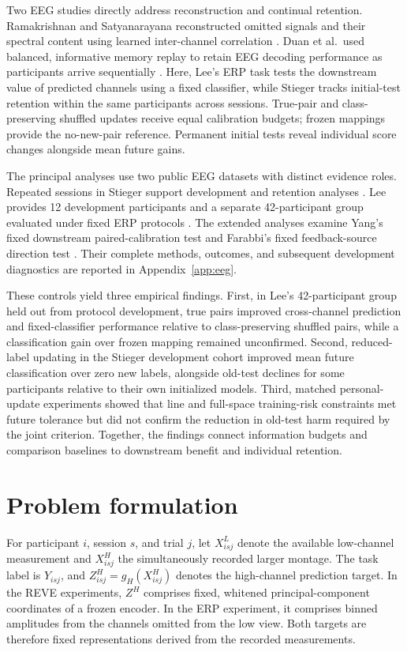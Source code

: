 \documentclass[11pt,a4paper]{article}
\begin{document}
Two EEG studies directly address reconstruction and continual retention. Ramakrishnan and Satyanarayana reconstructed omitted signals and their spectral content using learned inter-channel correlation \cite{ramakrishnan2016}. Duan et al.\ used balanced, informative memory replay to retain EEG decoding performance as participants arrive sequentially \cite{duan2024}. Here, Lee's ERP task tests the downstream value of predicted channels using a fixed classifier, while Stieger tracks initial-test retention within the same participants across sessions. True-pair and class-preserving shuffled updates receive equal calibration budgets; frozen mappings provide the no-new-pair reference. Permanent initial tests reveal individual score changes alongside mean future gains.

The principal analyses use two public EEG datasets with distinct evidence roles. Repeated sessions in Stieger support development and retention analyses \cite{stieger2021}. Lee provides 12 development participants and a separate 42-participant group evaluated under fixed ERP protocols \cite{lee2019}. The extended analyses examine Yang's fixed downstream paired-calibration test \cite{yang2025} and Farabbi's fixed feedback-source direction test \cite{farabbi2020}. Their complete methods, outcomes, and subsequent development diagnostics are reported in Appendix~\ref{app:eeg}.

These controls yield three empirical findings. First, in Lee's 42-participant group held out from protocol development, true pairs improved cross-channel prediction and fixed-classifier performance relative to class-preserving shuffled pairs, while a classification gain over frozen mapping remained unconfirmed. Second, reduced-label updating in the Stieger development cohort improved mean future classification over zero new labels, alongside old-test declines for some participants relative to their own initialized models. Third, matched personal-update experiments showed that line and full-space training-risk constraints met future tolerance but did not confirm the reduction in old-test harm required by the joint criterion. Together, the findings connect information budgets and comparison baselines to downstream benefit and individual retention.

\section{Problem formulation}
\label{sec:problem}

For participant $i$, session $s$, and trial $j$, let $X^L_{isj}$ denote the available low-channel measurement and $X^H_{isj}$ the simultaneously recorded larger montage. The task label is $Y_{isj}$, and $Z^H_{isj}=g_H(X^H_{isj})$ denotes the high-channel prediction target. In the REVE experiments, $Z^H$ comprises fixed, whitened principal-component coordinates of a frozen encoder. In the ERP experiment, it comprises binned amplitudes from the channels omitted from the low view. Both targets are therefore fixed representations derived from the recorded measurements.
\end{document}
